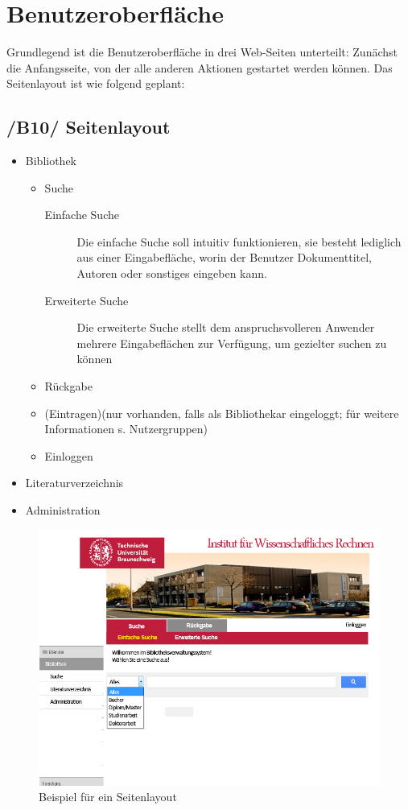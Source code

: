 \chapter{Benutzeroberfläche}

Grundlegend ist die Benutzeroberfläche in drei Web-Seiten unterteilt:
Zunächst die Anfangsseite, von der alle anderen Aktionen gestartet werden können.
Das Seitenlayout ist wie folgend geplant:


\section{/B10/ Seitenlayout}

 \begin{itemize}
   \item Bibliothek
   \begin{itemize}
    \item Suche
      \begin{description}
       \item[Einfache Suche] Die einfache Suche soll intuitiv funktionieren, sie besteht lediglich aus einer Eingabefläche, worin der Benutzer
       Dokumenttitel, Autoren oder sonstiges eingeben kann. 
       \item[Erweiterte Suche] Die erweiterte Suche stellt dem anspruchsvolleren Anwender mehrere Eingabeflächen zur Verfügung, um gezielter suchen zu können 
       \end{description}
      \item Rückgabe
      \item (Eintragen)(nur vorhanden, falls als Bibliothekar eingeloggt; für weitere Informationen s. Nutzergruppen)
      \item Einloggen
    \end{itemize}
    \item Literaturverzeichnis
    \item Administration
 \end{itemize}
 
\begin{figure}
\includegraphics[width=0.8\linewidth]{bilder/layout2.jpg}
\caption{Beispiel für ein Seitenlayout}
\end{figure}

